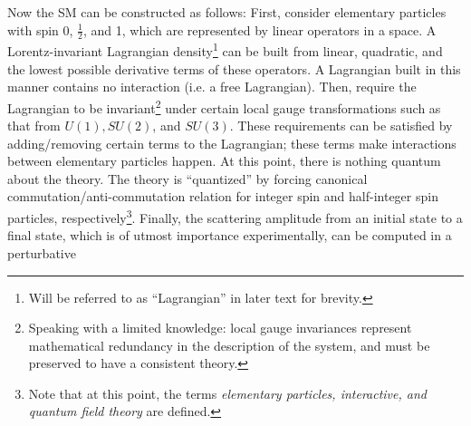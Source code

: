 Now the SM can be constructed as follows:
First, consider elementary particles with spin 0, $\frac{1}{2}$, and 1,
which are represented by linear operators in a space.
A Lorentz-invariant Lagrangian density\footnote{
    Will be referred to as ``Lagrangian'' in later text for brevity.
} can be built from
linear, quadratic, and the lowest possible derivative terms of these
operators.
A Lagrangian built in this manner contains no interaction (i.e. a free
Lagrangian).
Then, require the Lagrangian to be invariant\footnote{
    Speaking with a limited knowledge: local gauge invariances represent
    mathematical redundancy in the description of the system,
    and must be preserved to have a consistent theory.
} under certain local gauge transformations
such as that from $U(1), SU(2)$, and $SU(3)$.
These requirements can be satisfied by adding/removing certain terms to the
Lagrangian;
these terms make interactions between elementary particles happen.
At this point, there is nothing quantum about the theory.
The theory is ``quantized'' by forcing canonical commutation/anti-commutation
relation for integer spin and half-integer spin particles,
respectively\footnote{
    Note that at this point, the terms
    \emph{elementary particles, interactive, and quantum field theory}
    are defined.
}.
Finally, the scattering amplitude from an initial state to a final state,
which is of utmost importance experimentally,
can be computed in a perturbative
